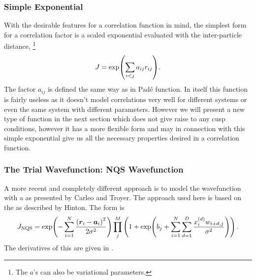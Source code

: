     \subsubsection{Simple Exponential}
        With the desirable features for a correlation function in mind, the
        simplest form for a correlation factor is a scaled exponential
        evaluated with the inter-particle distance, \footnote{The $a$'s can
        also be variational parameters.}
            \begin{equation}
                J = \exp(\sum\limits_{i<j} a_{ij} r_{ij}).
            \end{equation}
        The factor $a_{ij}$ is defined the same way as in Pad\'e function. In
        itself this function is fairly useless as it doesn't model correlations
        very well for different systems or even the same system with different
        parameters. However we will present a new type of function in the next
        section which does not give raise to any cusp conditions, however it
        has a more flexible form and may in connection with this simple
        exponential give us all the necessary properties desired in a
        correlation function.

    \subsubsection{The Trial Wavefunction: NQS Wavefunction
    \label{sususec:NQSJastrow}}
        A more recent and completely different approach is to model the
        wavefunction with a  as presented by Carleo and
        Troyer\cite{CarleoANN}. The approach used here is based on the
         as described by
        Hinton\cite{RBMpractical}. The form is
            \begin{equation}
                J_{\text{NQS}} = \exp(-\suml{i=1}{N} \frac{\left(\blds{r}_i -
                \blds{a}_i\right)^2}{2\sigma^2})\prod\limits^{M}_j \left(1 +
                \exp(b_j + \suml{i=1}{N}\suml{d=1}{D}
                \frac{x^{(d)}_iw_{i+d,j}}{\sigma^2})\right).
                \label{eq:nqsdef}
            \end{equation}
        The derivatives of this are given in .

